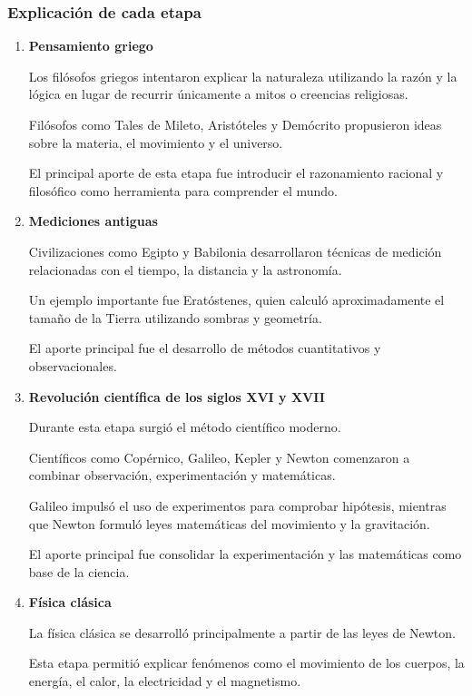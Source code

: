 \documentclass[12pt, a4paper]{article}
\begin{document}
\subsubsection*{Explicación de cada etapa}

\begin{enumerate}[label=\arabic*.]

\item \textbf{Pensamiento griego}

Los filósofos griegos intentaron explicar la naturaleza utilizando la razón y la lógica en lugar de recurrir únicamente a mitos o creencias religiosas.

Filósofos como Tales de Mileto, Aristóteles y Demócrito propusieron ideas sobre la materia, el movimiento y el universo.

El principal aporte de esta etapa fue introducir el razonamiento racional y filosófico como herramienta para comprender el mundo.

\item \textbf{Mediciones antiguas}

Civilizaciones como Egipto y Babilonia desarrollaron técnicas de medición relacionadas con el tiempo, la distancia y la astronomía.

Un ejemplo importante fue Eratóstenes, quien calculó aproximadamente el tamaño de la Tierra utilizando sombras y geometría.

El aporte principal fue el desarrollo de métodos cuantitativos y observacionales.

\item \textbf{Revolución científica de los siglos XVI y XVII}

Durante esta etapa surgió el método científico moderno.

Científicos como Copérnico, Galileo, Kepler y Newton comenzaron a combinar observación, experimentación y matemáticas.

Galileo impulsó el uso de experimentos para comprobar hipótesis, mientras que Newton formuló leyes matemáticas del movimiento y la gravitación.

El aporte principal fue consolidar la experimentación y las matemáticas como base de la ciencia.

\item \textbf{Física clásica}

La física clásica se desarrolló principalmente a partir de las leyes de Newton.

Esta etapa permitió explicar fenómenos como el movimiento de los cuerpos, la energía, el calor, la electricidad y el magnetismo.


\end{enumerate}
\end{document}
